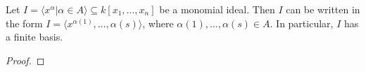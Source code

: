 \begin{theorem}\label{thm:Dickson(MvPolynomial)}
    \leanok %
    Let $I = \langle x^{\alpha} | \alpha \in A \rangle \subseteq k[x_1, \ldots, x_n]$ be a monomial ideal.
    Then $I$ can be written in the form $I = \langle x^{\alpha(1)}, \ldots , {\alpha(s)} \rangle$, where
    $\alpha(1), \ldots, \alpha(s) \in A$.
    In particular, $I$ has a finite basis.
\end{theorem}
\begin{proof}
  \leanok %
\end{proof}